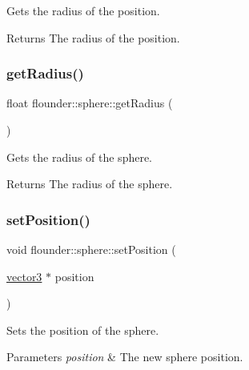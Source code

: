 Gets the radius of the position. 

\begin{DoxyReturn}{Returns}
The radius of the position. 
\end{DoxyReturn}
\mbox{\label{classflounder_1_1sphere_afb370d1ab8dc82e6bd8a59fc8cba87e7}} 
\subsubsection{\texorpdfstring{get\+Radius()}{getRadius()}}
{\footnotesize\ttfamily float flounder\+::sphere\+::get\+Radius (\begin{DoxyParamCaption}{ }\end{DoxyParamCaption})\hspace{0.3cm}{\ttfamily [inline]}}



Gets the radius of the sphere. 

\begin{DoxyReturn}{Returns}
The radius of the sphere. 
\end{DoxyReturn}
\mbox{\label{classflounder_1_1sphere_aefc59c69374508ea42237e0e9204cf8f}} 
\subsubsection{\texorpdfstring{set\+Position()}{setPosition()}}
{\footnotesize\ttfamily void flounder\+::sphere\+::set\+Position (\begin{DoxyParamCaption}\item[{\hyperlink{classflounder_1_1vector3}{vector3} $\ast$}]{position }\end{DoxyParamCaption})\hspace{0.3cm}{\ttfamily [inline]}}



Sets the position of the sphere. 


\begin{DoxyParams}{Parameters}
{\em position} & The new sphere position. \\
\hline
\end{DoxyParams}
\mbox{\label{classflounder_1_1sphere_aa1b5e29fd71de3c0b5f93a548ad9acd7}} 
